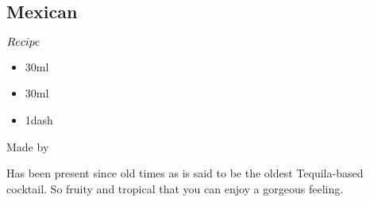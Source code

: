 \subsection{Mexican}
\begin{itembox}[l]{\boldmath $Recipe$}
\begin{itemize}
\setlength{\parskip}{0cm}
\setlength{\itemsep}{0cm}
\item \teq 30ml
\item \pj 30ml
\item \gs 1dash
\end{itemize}
\vspace{-4mm}
Made by \shake
\end{itembox}
Has been present since old times as is said to be the oldest Tequila-based cocktail. So fruity and tropical that you can enjoy a gorgeous feeling.
